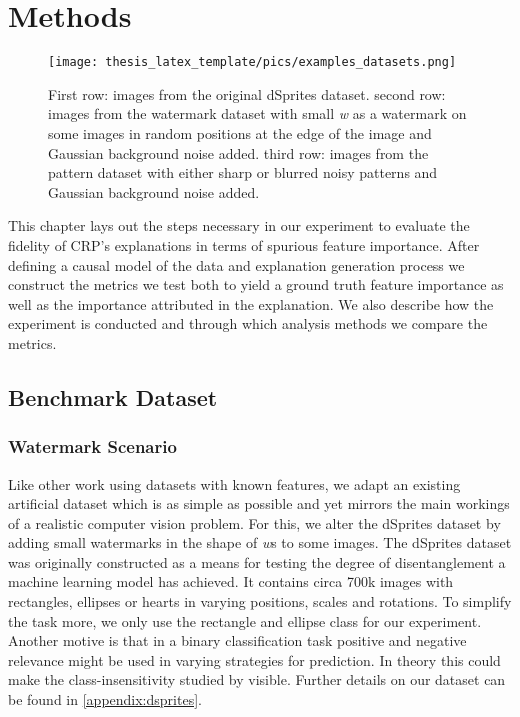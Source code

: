 \chapter{Methods}\label{chapter:method}

\begin{figure}[h!]
    \centering
    \texttt{[image: thesis\_latex\_template/pics/examples\_datasets.png]}
    \caption[Example Images Watermark and Pattern Scenario]{First row: images from the original dSprites dataset. 
    second row: images from the watermark dataset with small \textit{w} as a watermark on some images in random positions at the edge of the image and Gaussian background noise added. 
    third row: images from the pattern dataset with either sharp or blurred noisy patterns and Gaussian background noise added.}
    \label{fig:dsprites_examples}
\end{figure}

This chapter lays out the steps necessary in our experiment to evaluate the fidelity of CRP's explanations in terms of spurious feature importance. 
After defining a causal model of the data and explanation generation process we construct the metrics we test both to yield a ground truth feature importance as well as the importance attributed in the explanation. We also describe how the experiment is conducted and through which analysis methods we compare the metrics.

\section{Benchmark Dataset}

\subsection{Watermark Scenario}\label{section:dataset_wdsprites}
Like other work using datasets with known features, we adapt an existing artificial dataset which is as simple as possible and yet mirrors the main workings of a realistic computer vision problem. For this, we alter the dSprites dataset \citep{dsprites17} by adding small watermarks in the shape of \textit{w}s to some images. The dSprites dataset was originally constructed as a means for testing the degree of disentanglement a machine learning model has achieved. It contains circa 700k images with rectangles, ellipses or hearts in varying positions, scales and rotations. To simplify the task more, we only use the rectangle and ellipse class for our experiment. Another motive is that in a binary classification task positive and negative relevance might be used in varying strategies for prediction. In theory this could make the class-insensitivity studied by \citet{Sixt2020} visible. Further details on our dataset can be found in \cref{appendix:dsprites}.

